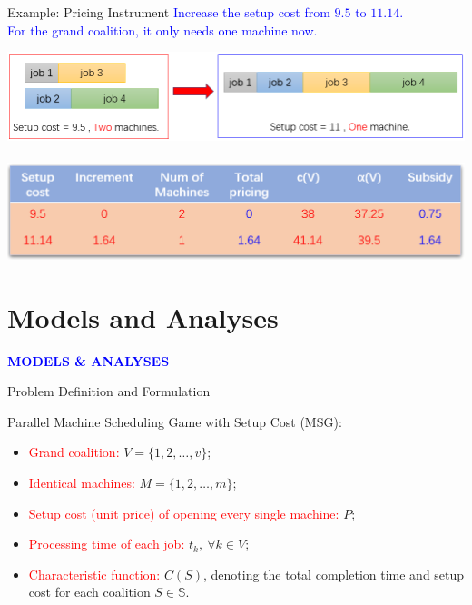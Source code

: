 \documentclass[14pt]{beamer}
\begin{document}
\begin{frame}{Example: Pricing Instrument}
\small
\centering
\textcolor{blue}{Increase the setup cost from $9.5$ to $11.14$.\\
For the grand coalition, it only needs one machine now.}
\vspace{2mm}

\centering
\includegraphics[width = 1\textwidth]{Figures/m0.png}
~\\
\centering
\includegraphics[width = 1\textwidth]{Figures/m5.png}
\end{frame}

\section{Models and Analyses}
\begin{frame}
\centering
\large
\textcolor{blue}{\bf {\huge M}ODELS \&  {\huge A}NALYSES}
\end{frame}


\begin{frame}{Problem Definition and Formulation}
	\begin{definition}\label{definition:IVPU}
	\small
	\justifying
	Parallel Machine Scheduling Game with Setup Cost (MSG):\\
	\begin{itemize}
	\pause
	\item \textcolor{red}{Grand coalition:} $V = \{1,2,\ldots,v\}$;
	\pause
	\item \textcolor{red}{Identical machines:} $M = \{1,2,\ldots,m\}$;
	\pause
	\item \textcolor{red}{Setup cost (unit price) of opening every single machine:} $P$;
	\pause
	\item \textcolor{red}{Processing time of each job:} $t_k,~\forall k \in V$;
	\pause
	\item \textcolor{red}{Characteristic function:} $C(S) $, denoting the total completion time and setup cost for each coalition $S \in \mathbb{S}$.
	\end{itemize}
	~\\
	\end{definition}
\end{frame}
\end{document}
